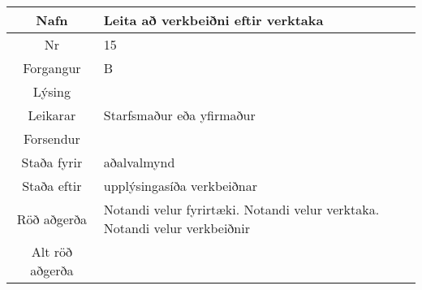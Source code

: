 \documentclass[a4paper]{article}
\begin{document}
\begin{tabular}{|c|p{10cm}|}
\hline
Nafn&Leita að verkbeiðni eftir verktaka\\
\hline
Nr&15\\
\hline
Forgangur&B\\
\hline
Lýsing&\\
\hline
Leikarar&Starfsmaður eða yfirmaður\\
\hline
Forsendur&\\
\hline
Staða fyrir&aðalvalmynd\\
\hline
Staða eftir&upplýsingasíða verkbeiðnar\\
\hline
Röð aðgerða&Notandi velur fyrirtæki. Notandi velur verktaka. Notandi velur verkbeiðnir\\
\hline
Alt röð aðgerða&\\
\hline
\end{tabular}
\end{document}
